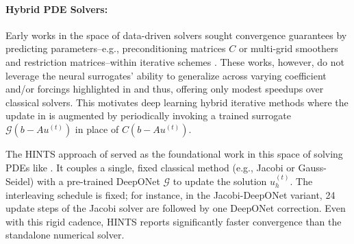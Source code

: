 \documentclass{article} %
\begin{document}
\paragraph{Hybrid PDE Solvers:}
Early works in the space of data-driven solvers sought convergence guarantees by 
predicting parameters--e.g., preconditioning matrices $C$ or multi-grid smoothers and restriction matrices--within iterative schemes \citep{taghibakhshi2021optimization,caldana2024deep,kopanivcakova2025deeponet,huang2022learning,katrutsa2020black}. These works, however, do not leverage the neural surrogates' ability to generalize across varying coefficient and/or forcings highlighted in  and thus, offering only modest speedups over classical solvers. This motivates deep learning hybrid iterative methods where the update in  is augmented by periodically invoking a trained surrogate $\mathcal{G}\left(b - Au^{(t)}\right)$ in place of $C\left(b - Au^{(t)}\right)$.


The HINTS approach of \citet{zhang2024blending} served as the foundational work in this space of solving PDEs like .
It couples a single, fixed classical method (e.g., Jacobi or Gauss-Seidel) with a pre-trained DeepONet $\mathcal{G}$ to update the solution $u^{\left(t\right)}_h$. 
The interleaving schedule is fixed; for instance, in the Jacobi-DeepONet variant, 24 update steps of the Jacobi solver are followed by one DeepONet correction. Even with this rigid cadence, HINTS reports significantly faster convergence than the standalone numerical solver. 
\end{document}
